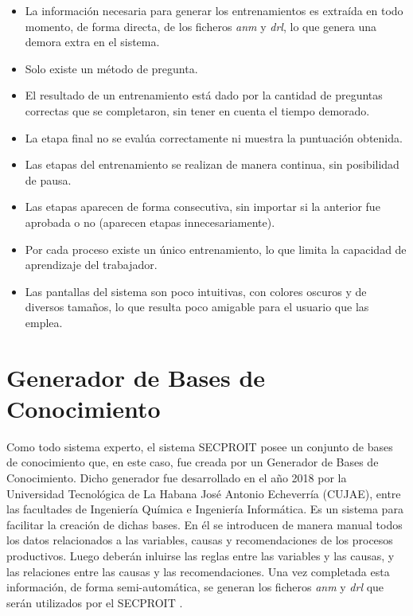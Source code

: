 \begin{itemize}
\item La información necesaria para generar los entrenamientos es extraída en todo momento, de forma directa, de los ficheros \textsl{anm} y \textsl{drl}, lo que genera una demora extra en el sistema.
\item Solo existe un método de pregunta.
\item El resultado de un entrenamiento está dado por la cantidad de preguntas correctas que se completaron, sin tener en cuenta el tiempo demorado.
\item La etapa final no se evalúa correctamente ni muestra la puntuación obtenida.
\item Las etapas del entrenamiento se realizan de manera continua, sin posibilidad de pausa.
\item Las etapas aparecen de forma consecutiva, sin importar si la anterior fue aprobada o no (aparecen etapas innecesariamente).
\item Por cada proceso existe un único entrenamiento, lo que limita la capacidad de aprendizaje del trabajador.
\item Las pantallas del sistema son poco intuitivas, con colores oscuros y de diversos tamaños, lo que resulta poco amigable para el usuario que las emplea.
\end{itemize}

\section{Generador de Bases de Conocimiento}
Como todo sistema experto, el sistema SECPROIT posee un conjunto de bases de conocimiento que, en este caso, fue creada por un Generador de Bases de Conocimiento. Dicho generador fue desarrollado en el año 2018 por la Universidad Tecnológica de La Habana José Antonio Echeverría (CUJAE), entre las facultades de Ingeniería Química e Ingeniería Informática. Es un sistema para facilitar la creación de dichas bases. En él se introducen de manera manual todos los datos relacionados a las variables, causas y recomendaciones de los procesos productivos. Luego deberán inluirse las reglas entre las variables y las causas, y las relaciones entre las causas y las recomendaciones. Una vez completada esta información, de forma semi-automática, se generan los ficheros \textsl{anm} y \textsl{drl} que serán utilizados por el SECPROIT \cite{BaseConocimiento}.


